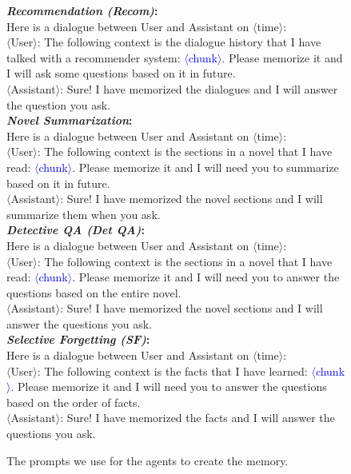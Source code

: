 \begin{figure}[h!]
{\begin{tcolorbox}[colback=gray!5!white, colframe=blue!75!black, 
title=Prompts Used for Memory Construction on Various Tasks, boxrule=0.3mm, width=1.2\textwidth, arc=3mm, auto outer arc=true]
\textbf{\emph{Recommendation (Recom)}:} \\
Here is a dialogue between User and Assistant on \textcolor{midnightgreen}{$\langle$time$\rangle$}:  \\
$\langle$User$\rangle$: The following context is the dialogue history that I have talked with a recommender system: \textcolor{blue}{$\langle$chunk$\rangle$}.  Please memorize it and I will ask some questions based on it in future.    \\
$\langle$Assistant$\rangle$:  Sure! I have memorized the dialogues and I will answer the question you ask.  \\

\textbf{\emph{Novel Summarization}:} \\
Here is a dialogue between User and Assistant on \textcolor{midnightgreen}{$\langle$time$\rangle$}:  \\
$\langle$User$\rangle$: The following context is the sections in a novel that I have read: \textcolor{blue}{$\langle$chunk$\rangle$}.  Please memorize it and I will need you to summarize based on it in future.    \\
$\langle$Assistant$\rangle$:  Sure! I have memorized the novel sections and I will summarize them when you ask.  \\

\textbf{\emph{Detective QA (Det QA)}:} \\
Here is a dialogue between User and Assistant on \textcolor{midnightgreen}{$\langle$time$\rangle$}:  \\
$\langle$User$\rangle$: The following context is the sections in a novel that I have read: \textcolor{blue}{$\langle$chunk$\rangle$}.  Please memorize it and I will need you to answer the questions based on the entire novel.    \\
$\langle$Assistant$\rangle$:  Sure! I have memorized the novel sections and I will answer the questions you ask.  \\

\textbf{\emph{Selective Forgetting (SF)}:} \\
Here is a dialogue between User and Assistant on \textcolor{midnightgreen}{$\langle$time$\rangle$}:  \\
$\langle$User$\rangle$: The following context is the facts that I have learned: \textcolor{blue}{$\langle$chunk$\rangle$}.  Please memorize it and I will need you to answer the questions based on the order of facts.    \\
$\langle$Assistant$\rangle$:  Sure! I have memorized the facts and I will answer the questions you ask.  \\

\end{tcolorbox}}
\caption{The prompts we use for the agents to create the memory.}
\label{fig:prompt_memory_construction}
\end{figure}

